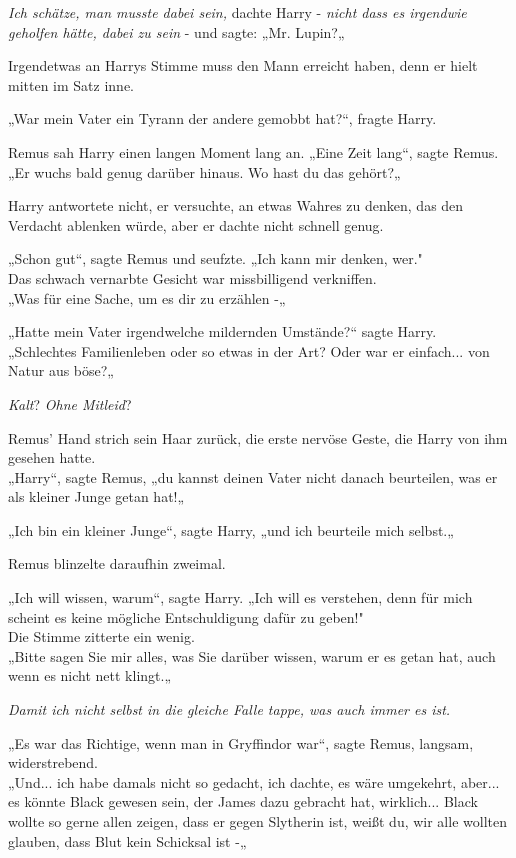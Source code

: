 {\emph{Ich schätze, man musste dabei sein,} dachte Harry - \emph{nicht dass es irgendwie geholfen hätte, dabei zu sein} - und sagte: „Mr. Lupin?„

Irgendetwas an Harrys Stimme muss den Mann erreicht haben, denn er hielt mitten im Satz inne.

„War mein Vater ein Tyrann der andere gemobbt hat?“, fragte Harry.

Remus sah Harry einen langen Moment lang an. „Eine Zeit lang“, sagte Remus.\\ „Er wuchs bald genug darüber hinaus. Wo hast du das gehört?„

Harry antwortete nicht, er versuchte, an etwas Wahres zu denken, das den Verdacht ablenken würde, aber er dachte nicht schnell genug.

„Schon gut“, sagte Remus und seufzte. „Ich kann mir denken, wer."\\ Das schwach vernarbte Gesicht war missbilligend verkniffen.\\ „Was für eine Sache, um es dir zu erzählen -„

„Hatte mein Vater irgendwelche mildernden Umstände?“ sagte Harry.\\ „Schlechtes Familienleben oder so etwas in der Art? Oder war er einfach... von Natur aus böse?„

\emph{Kalt}? \emph{Ohne Mitleid}?

Remus' Hand strich sein Haar zurück, die erste nervöse Geste, die Harry von ihm gesehen hatte.\\ „Harry“, sagte Remus, „du kannst deinen Vater nicht danach beurteilen, was er als kleiner Junge getan hat!„

„Ich bin ein kleiner Junge“, sagte Harry, „und ich beurteile mich selbst.„

Remus blinzelte daraufhin zweimal.

„Ich will wissen, warum“, sagte Harry. „Ich will es verstehen, denn für mich scheint es keine mögliche Entschuldigung dafür zu geben!"\\ Die Stimme zitterte ein wenig.\\ „Bitte sagen Sie mir alles, was Sie darüber wissen, warum er es getan hat, auch wenn es nicht nett klingt.„

\emph{Damit ich nicht selbst in die gleiche Falle tappe, was auch immer es ist.}

„Es war das Richtige, wenn man in Gryffindor war“, sagte Remus, langsam, widerstrebend.\\ „Und... ich habe damals nicht so gedacht, ich dachte, es wäre umgekehrt, aber... es könnte Black gewesen sein, der James dazu gebracht hat, wirklich... Black wollte so gerne allen zeigen, dass er gegen Slytherin ist, weißt du, wir alle wollten glauben, dass Blut kein Schicksal ist -„

}
